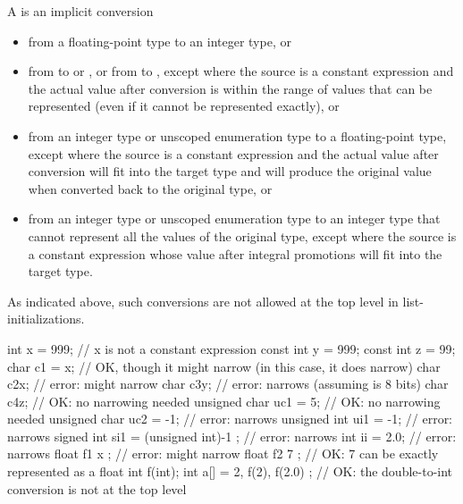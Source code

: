 \pnum
A
%
%
 is an implicit conversion

\begin{itemize}
\item from a floating-point type to an integer type, or

\item from  to  or , or from
 to , except where the source is a constant expression and
the actual value after conversion
is within the range of values that can be represented (even if it cannot be represented exactly),
or

\item from an integer type or unscoped enumeration type to a floating-point type, except
where the source is a constant expression and the actual value after conversion will fit
into the target type and will produce the original value when converted back to the
original type, or

\item from an integer type or unscoped enumeration type to an integer type that cannot
represent all the values of the original type, except where the source is a constant
expression whose value after integral promotions will fit into the target type.
\end{itemize}

\enternote As indicated above, such conversions are not allowed at the top level in
list-initializations.\exitnote \enterexample

\begin{codeblock}
int x = 999;              // x is not a constant expression
const int y = 999;
const int z = 99;
char c1 = x;              // OK, though it might narrow (in this case, it does narrow)
char c2{x};               // error: might narrow
char c3{y};               // error: narrows (assuming  is 8 bits)
char c4{z};               // OK: no narrowing needed
unsigned char uc1 = {5};  // OK: no narrowing needed
unsigned char uc2 = {-1}; // error: narrows
unsigned int ui1 = {-1};  // error: narrows
signed int si1 =
  { (unsigned int)-1 };   // error: narrows
int ii = {2.0};           // error: narrows
float f1 { x };           // error: might narrow
float f2 { 7 };           // OK: 7 can be exactly represented as a float
int f(int);
int a[] =
  { 2, f(2), f(2.0) };    // OK: the double-to-int conversion is not at the top level
\end{codeblock}
\exitexample%
%
%
